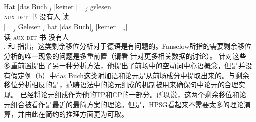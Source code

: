 \eal
\ex 
\gll {}Hat [das Buch]$_j$ [keiner [ \_$_j$ gelesen]].\\
	{}\textsc{aux} \spacebr{}\textsc{det} 书 \spacebr{}没有人 \spacebr{}{} {} 读\\
\ex 
\gll {}[ \_$_j$ Gelesen]$_i$ hat [das Buch]$_j$ [keiner \_$_i$].\\
	{}\spacebr{}{} {} 读 \textsc{aux} \spacebr{}\textsc{det} 书 \spacebr{}没有人\\
\zl
 \citet[]{Haider93a}, %
 \citet[\S~2]{dKM2001a}和 \citet{Fanselow2002a}指出，这类剩余移位分析对于德语是有问题的。Fanselow所指的需要剩余移位分析的唯一现象的问题是多重前置（请看 
针对更多相关数据的讨论）。 \citet{Mueller2005c,Mueller2005d,MuellerGS}针对这些多重前置提出了另一种分析方法，他提出了前场中的空动词中心语概念，但是并没有假定例（b）中das Buch这类附加语和论元是从前场成分中提取出来的。与剩余移位分析相反的是，范畴语法\citep{Geach70a,HN94a}中的论元组成的机制被用来确保句中论元的合理实现。 \citet[]{Chomsky2007a}已经将论元组成作为他的TP和CP的一部分。所以说，这两个剩余移位和论元组合被看作是最近的最简方案的理论。但是，HPSG看起来不需要太多的理论演算，并由此在简约的推理方面更为可取。

